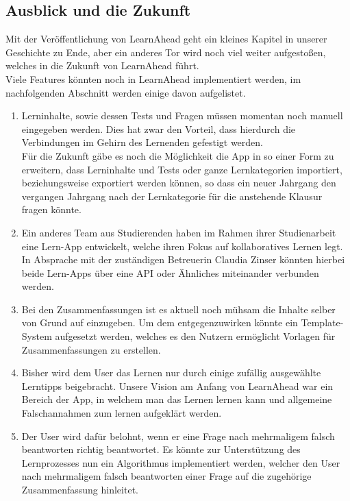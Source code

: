 \subsection{Ausblick und die Zukunft}\label{sec:Ausblick}
Mit der Veröffentlichung von LearnAhead geht ein kleines Kapitel in unserer Geschichte zu Ende, aber ein anderes Tor wird noch viel weiter aufgestoßen, welches in die Zukunft von LearnAhead führt.\\
Viele Features könnten noch in LearnAhead implementiert werden, im nachfolgenden Abschnitt werden einige davon aufgelistet.\\
\begin{enumerate}
    \item Lerninhalte, sowie dessen Tests und Fragen müssen momentan noch manuell eingegeben werden. Dies hat zwar den Vorteil, dass hierdurch die Verbindungen im Gehirn des Lernenden gefestigt werden.\\
    Für die Zukunft gäbe es noch die Möglichkeit die App in so einer Form zu erweitern, dass Lerninhalte und Tests oder ganze Lernkategorien importiert, beziehungsweise exportiert werden können, so dass ein neuer Jahrgang den vergangen Jahrgang nach der Lernkategorie für die anstehende Klausur fragen könnte.
    \item Ein anderes Team aus Studierenden haben im Rahmen ihrer Studienarbeit eine Lern-App entwickelt, welche ihren Fokus auf kollaboratives Lernen legt. In Absprache mit der zuständigen Betreuerin Claudia Zinser könnten hierbei beide Lern-Apps über eine API oder Ähnliches miteinander verbunden werden.
    \item Bei den Zusammenfassungen ist es aktuell noch mühsam die Inhalte selber von Grund auf einzugeben. Um dem entgegenzuwirken könnte ein Template-System aufgesetzt werden, welches es den Nutzern ermöglicht Vorlagen für Zusammenfassungen zu erstellen.
    \item Bisher wird dem User das Lernen nur durch einige zufällig ausgewählte Lerntipps beigebracht. Unsere Vision am Anfang von LearnAhead war ein Bereich der App, in welchem man das Lernen lernen kann und allgemeine Falschannahmen zum lernen aufgeklärt werden.
    \item Der User wird dafür belohnt, wenn er eine Frage nach mehrmaligem falsch beantworten richtig beantwortet. Es könnte zur Unterstützung des Lernprozesses nun ein Algorithmus implementiert werden, welcher den User nach mehrmaligem falsch beantworten einer Frage auf die zugehörige Zusammenfassung hinleitet.\\

\end{enumerate}
